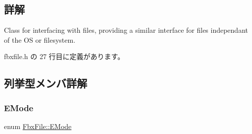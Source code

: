 \subsection{詳解}
Class for interfacing with files, providing a similar interface for files independant of the OS or filesystem. 

 fbxfile.\+h の 27 行目に定義があります。



\subsection{列挙型メンバ詳解}
\mbox{\label{class_fbx_file_a0370e8fd17b3658f718e1350a6a6f462}} 
\subsubsection{\texorpdfstring{E\+Mode}{EMode}}
{\footnotesize\ttfamily enum \hyperlink{class_fbx_file_a0370e8fd17b3658f718e1350a6a6f462}{Fbx\+File\+::\+E\+Mode}}

